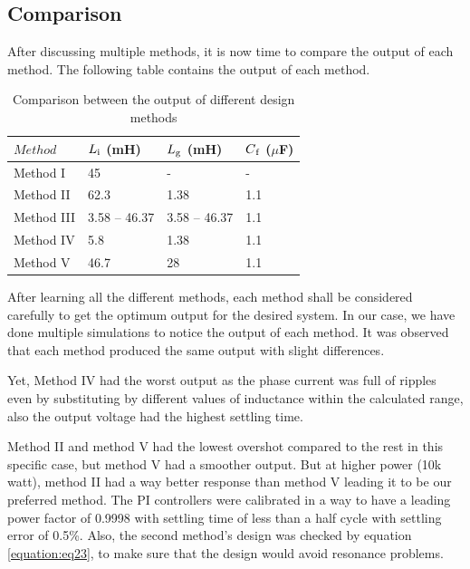 \documentclass[12pt,a4paper]{book}
\begin{document}
\subsection{Comparison}
After discussing multiple methods, it is now time to compare the output of each method. The following table contains the output of each method.

\begin{table}[h!]
  \centering
  \begin{tabular}{p{3.5cm} p{3.5cm} p{3.5cm} p{3.5cm}} 
   \hline
   $Method$ & $L\textsubscript{i}$ (mH) & $L\textsubscript{g}$ (mH) & $C\textsubscript{f}$ (\(\mu\)F) \\ [0.5ex] 
   \hline
   Method I & 45 & - & - \\
   Method II & 62.3 & 1.38 & 1.1 \\
   Method III & 3.58 -- 46.37 & 3.58 -- 46.37 & 1.1 \\
   Method IV & 5.8 & 1.38 & 1.1 \\
   Method V & 46.7 & 28 & 1.1 \\[1ex] 
   \hline
  \end{tabular}
  \caption{Comparison between the output of different design methods}
\end{table}
After learning all the different methods, each method shall be considered carefully to get the optimum output for the desired system. In our case, we have done multiple simulations to notice the output of each method. It was observed that each method produced the same output with slight differences. 

Yet, Method IV had the worst output as the phase current was full of ripples even by substituting by different values of inductance within the calculated range, also the output voltage had the highest settling time.

Method II and method V had the lowest overshot compared to the rest in this specific case, but method V had a smoother output. But at higher power (10k watt), method II had a way better response than method V leading it to be our preferred method. The PI controllers were calibrated in a way to have a leading power factor of 0.9998 with settling time of less than a half cycle with settling error of 0.5\%. Also, the second method’s design was checked by equation \ref{equation:eq23}, to make sure that the design would avoid resonance problems. 
\end{document}
